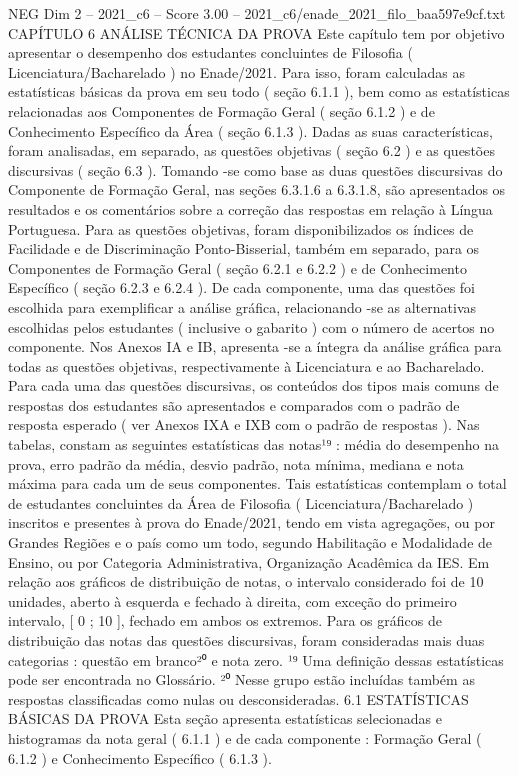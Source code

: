 \begin{textsample}{NEG Dim 2 – 2021\_c6 – Score 3.00 – 2021\_c6/enade\_2021\_filo\_baa597e9cf.txt}  \label{ex:f2_neg_259}
CAPÍTULO 6 ANÁLISE TÉCNICA DA PROVA Este capítulo tem por objetivo apresentar o desempenho dos estudantes concluintes de Filosofia ( Licenciatura/Bacharelado ) no Enade/2021.
Para isso, foram calculadas as estatísticas básicas da prova em seu todo ( seção 6.1.1 ), bem como as estatísticas relacionadas aos Componentes de Formação Geral ( seção 6.1.2 ) e de Conhecimento Específico da Área ( seção 6.1.3 ).
Dadas as suas características, foram analisadas, em separado, as questões objetivas ( seção 6.2 ) e as questões discursivas ( seção 6.3 ).
Tomando -se como base as duas questões discursivas do Componente de Formação Geral, nas seções 6.3.1.6 a 6.3.1.8, são apresentados os resultados e os comentários sobre a correção das respostas em relação à Língua Portuguesa.
Para as questões objetivas, foram disponibilizados os índices de Facilidade e de Discriminação Ponto-Bisserial, também em separado, para os Componentes de Formação Geral ( seção 6.2.1 e 6.2.2 ) e de Conhecimento Específico ( seção 6.2.3 e 6.2.4 ).
De cada componente, uma das questões foi escolhida para exemplificar a análise gráfica, relacionando -se as alternativas escolhidas pelos estudantes ( inclusive o gabarito ) com o número de acertos no componente.
Nos Anexos IA e IB, apresenta -se a íntegra da análise gráfica para todas as questões objetivas, respectivamente à Licenciatura e ao Bacharelado.
Para cada uma das questões discursivas, os conteúdos dos tipos mais comuns de respostas dos estudantes são apresentados e comparados com o padrão de resposta esperado ( ver Anexos IXA e IXB com o padrão de respostas ).
Nas tabelas, constam as seguintes estatísticas das notas¹⁹ : média do desempenho na prova, erro padrão da média, desvio padrão, nota mínima, mediana e nota máxima para cada um de seus componentes.
Tais estatísticas contemplam o total de estudantes concluintes da Área de Filosofia ( Licenciatura/Bacharelado ) inscritos e presentes à prova do Enade/2021, tendo em vista agregações, ou por Grandes Regiões e o país como um todo, segundo Habilitação e Modalidade de Ensino, ou por Categoria Administrativa, Organização Acadêmica da IES.
Em relação aos gráficos de distribuição de notas, o intervalo considerado foi de 10 unidades, aberto à esquerda e fechado à direita, com exceção do primeiro intervalo, [ 0 ; 10 ], fechado em ambos os extremos.
Para os gráficos de distribuição das notas das questões discursivas, foram consideradas mais duas categorias : questão em branco²⁰ e nota zero. ¹⁹ Uma definição dessas estatísticas pode ser encontrada no Glossário. ²⁰ Nesse grupo estão incluídas também as respostas classificadas como nulas ou desconsideradas. 6.1 ESTATÍSTICAS BÁSICAS DA PROVA Esta seção apresenta estatísticas selecionadas e histogramas da nota geral ( 6.1.1 ) e de cada componente : Formação Geral ( 6.1.2 ) e Conhecimento Específico ( 6.1.3 ).

\end{textsample}
